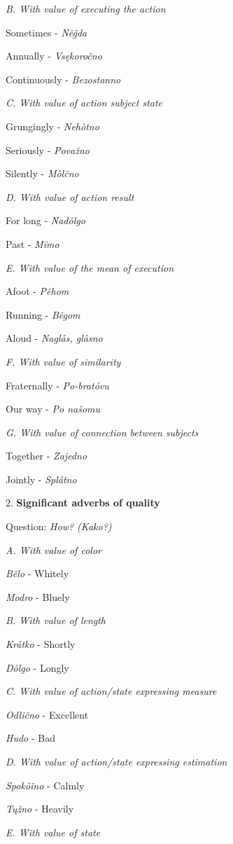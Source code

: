 \textit{B. With value of executing the action}

Sometimes - \textit{Něĝda}

Annually - \textit{Vsękoročno}

Continuously - \textit{Bezostanno}

\textit{C. With value of action subject state}

Grungingly - \textit{Nehòtno}

Seriously - \textit{Považno}

Silently - \textit{Mòlčno}

\textit{D. With value of action result}

For long - \textit{Nadôlgo}

Past - \textit{Mïmo}

\textit{E. With value of the mean of execution}

Afoot - \textit{Pěhom}

Running - \textit{Běgom}

Aloud - \textit{Naglås, glåsno}

\textit{F. With value of similarity}

Fraternally - \textit{Po-bratóvu}

Our way - \textit{Po našomu}

\textit{G. With value of connection between subjects}

Together - \textit{Zajedno}

Jointly - \textit{Splåtno}

2. \textbf{Significant adverbs of quality}

Question: \textit{How? (Kako?)}

\textit{A. With value of color}

\textit{Bělo} - Whitely

\textit{Modro} - Bluely

\textit{B. With value of length}

\textit{Kråtko} - Shortly

\textit{Dôlgo} - Longly

\textit{C. With value of action/state expressing measure}

\textit{Odlično} - Excellent

\textit{Hudo} - Bad

\textit{D. With value of action/state expressing estimation}

\textit{Spokôǐno} - Calmly

\textit{Tųžno} - Heavily

\textit{E. With value of state}

